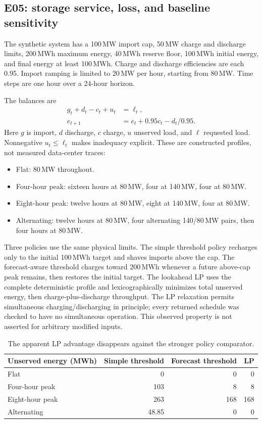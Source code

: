 \documentclass[11pt,letterpaper]{article}
\begin{document}
\subsection{E05: storage service, loss, and baseline sensitivity}
The synthetic system has a 100\,MW import cap, 50\,MW charge and discharge limits, 200\,MWh maximum energy, 40\,MWh reserve floor, 100\,MWh initial energy, and final energy at least 100\,MWh. Charge and discharge efficiencies are each 0.95. Import ramping is limited to 20\,MW per hour, starting from 80\,MW. Time steps are one hour over a 24-hour horizon.

The balances are
\begin{align}
 g_t+d_t-c_t+u_t&=\ell_t,\\
 e_{t+1}&=e_t+0.95c_t-d_t/0.95.
\end{align}
Here $g$ is import, $d$ discharge, $c$ charge, $u$ unserved load, and $\ell$ requested load. Nonnegative $u_t\le\ell_t$ makes inadequacy explicit. These are constructed profiles, not measured data-center traces:
\begin{itemize}
\item Flat: 80\,MW throughout.
\item Four-hour peak: sixteen hours at 80\,MW, four at 140\,MW, four at 80\,MW.
\item Eight-hour peak: twelve hours at 80\,MW, eight at 140\,MW, four at 80\,MW.
\item Alternating: twelve hours at 80\,MW, four alternating 140/80\,MW pairs, then four hours at 80\,MW.
\end{itemize}

Three policies use the same physical limits. The simple threshold policy recharges only to the initial 100\,MWh target and shaves imports above the cap. The forecast-aware threshold charges toward 200\,MWh whenever a future above-cap peak remains, then restores the initial target. The lookahead LP uses the complete deterministic profile and lexicographically minimizes total unserved energy, then charge-plus-discharge throughput. The LP relaxation permits simultaneous charging/discharging in principle; every returned schedule was checked to have no simultaneous operation. This observed property is not asserted for arbitrary modified inputs.

\begin{table}[ht]
\centering\begin{tabular}{lrrr}
\toprule Unserved energy (MWh) & Simple threshold & Forecast threshold & LP\\\midrule
Flat &0&0&0\\
Four-hour peak &103&8&8\\
Eight-hour peak &263&168&168\\
Alternating &48.85&0&0\\\bottomrule
\end{tabular}
\caption{The apparent LP advantage disappears against the stronger policy comparator.}
\label{tab:bess}
\end{table}
\end{document}
